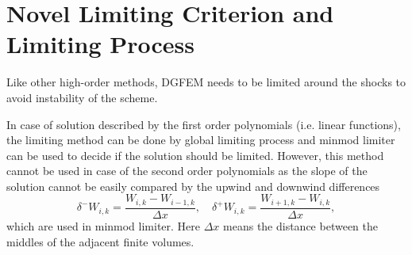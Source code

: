 \section{Novel Limiting Criterion and Limiting Process}\label{limSec}

Like other high-order methods, DGFEM needs to be limited around the shocks to avoid instability of the scheme.

In case of solution described by the first order polynomials (i.e. linear functions), the limiting method can be done by global limiting process and minmod limiter can be used to decide if the solution should be limited. However, this method cannot be used in case of the second order polynomials as the slope of the solution cannot be easily compared by the upwind and downwind differences
\begin{equation}\label{diff}
\delta^- W_{i,k}=\frac{W_{i,k}-W_{i-1,k}}{\Delta x},\quad \delta^+W_{i,k}=\frac{W_{i+1,k}-W_{i,k}}{\Delta x},
\end{equation}
which are used in minmod limiter. Here $\Delta x$ means the distance between the middles of the adjacent finite volumes.

